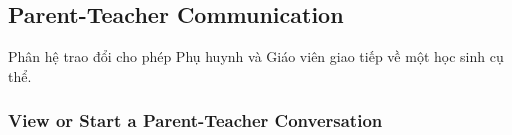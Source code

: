 \documentclass[12pt,a4paper,oneside]{report}
\begin{document}

\subsection{Parent-Teacher Communication}
\label{subsec:parent-teacher-communication}

Phân hệ trao đổi cho phép Phụ huynh và Giáo viên giao tiếp về một học sinh cụ thể.

\subsubsection{View or Start a Parent-Teacher Conversation}
\label{subsubsec:start-parent-teacher-conversation}
\end{document}
